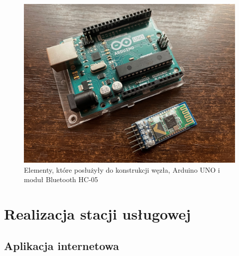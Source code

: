 \documentclass[12pt, twoside, openany]{mwrep}
\begin{document}
\begin{figure}[H]
\centering
\includegraphics[scale=0.12]{hc05}
\caption{Elementy, które posłużyły do konstrukcji węzła, Arduino UNO i moduł Bluetooth HC-05}
\end{figure}

\chapter{Realizacja stacji usługowej}

\section{Aplikacja internetowa}
\end{document}
